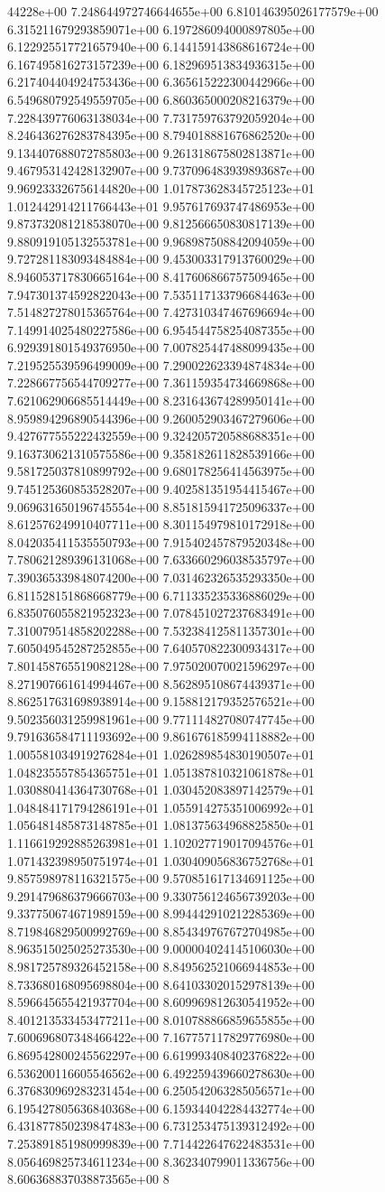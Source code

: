 44228e+00	7.248644972746644655e+00	6.810146395026177579e+00	6.315211679293859071e+00	6.197286094000897805e+00	6.122925517721657940e+00	6.144159143868616724e+00	6.167495816273157239e+00	6.182969513834936315e+00	6.217404404924753436e+00	6.365615222300442966e+00	6.549680792549559705e+00	6.860365000208216379e+00	7.228439776063138034e+00	7.731759763792059204e+00	8.246436276283784395e+00	8.794018881676862520e+00	9.134407688072785803e+00	9.261318675802813871e+00	9.467953142428132907e+00	9.737096483939893687e+00	9.969233326756144820e+00	1.017873628345725123e+01	1.012442914211766443e+01	9.957617693747486953e+00	9.873732081218538070e+00	9.812566650830817139e+00	9.880919105132553781e+00	9.968987508842094059e+00	9.727281183093484884e+00	9.453003317913760029e+00	8.946053717830665164e+00	8.417606866757509465e+00	7.947301374592822043e+00	7.535117133796684463e+00	7.514827278015365764e+00	7.427310347467696694e+00	7.149914025480227586e+00	6.954544758254087355e+00	6.929391801549376950e+00	7.007825447488099435e+00	7.219525539596499009e+00	7.290022623394874834e+00	7.228667756544709277e+00	7.361159354734669868e+00	7.621062906685514449e+00	8.231643674289950141e+00	8.959894296890544396e+00	9.260052903467279606e+00	9.427677555222432559e+00	9.324205720588688351e+00	9.163730621310575586e+00	9.358182611828539166e+00	9.581725037810899792e+00	9.680178256414563975e+00	9.745125360853528207e+00	9.402581351954415467e+00	9.069631650196745554e+00	8.851815941725096337e+00	8.612576249910407711e+00	8.301154979810172918e+00	8.042035411535550793e+00	7.915402457879520348e+00	7.780621289396131068e+00	7.633660296038535797e+00	7.390365339848074200e+00	7.031462326535293350e+00	6.811528151868668779e+00	6.711335235336886029e+00	6.835076055821952323e+00	7.078451027237683491e+00	7.310079514858202288e+00	7.532384125811357301e+00	7.605049545287252855e+00	7.640570822300934317e+00	7.801458765519082128e+00	7.975020070021596297e+00	8.271907661614994467e+00	8.562895108674439371e+00	8.862517631698938914e+00	9.158812179352576521e+00	9.502356031259981961e+00	9.771114827080747745e+00	9.791636584711193692e+00	9.861676185994118882e+00	1.005581034919276284e+01	1.026289854830190507e+01	1.048235557854365751e+01	1.051387810321061878e+01	1.030880414364730768e+01	1.030452083897142579e+01	1.048484171794286191e+01	1.055914275351006992e+01	1.056481485873148785e+01	1.081375634968825850e+01	1.116619292885263981e+01	1.102027719017094576e+01	1.071432398950751974e+01	1.030409056836752768e+01	9.857598978116321575e+00	9.570851617134691125e+00	9.291479686379666703e+00	9.330756124656739203e+00	9.337750674671989159e+00	8.994442910212285369e+00	8.719846829500992769e+00	8.854349767672704985e+00	8.963515025025273530e+00	9.000004024145106030e+00	8.981725789326452158e+00	8.849562521066944853e+00	8.733680168095698804e+00	8.641033020152978139e+00	8.596645655421937704e+00	8.609969812630541952e+00	8.401213533453477211e+00	8.010788866859655855e+00	7.600696807348466422e+00	7.167757117829776980e+00	6.869542800245562297e+00	6.619993408402376822e+00	6.536200116605546562e+00	6.492259439660278630e+00	6.376830969283231454e+00	6.250542063285056571e+00	6.195427805636840368e+00	6.159344042284432774e+00	6.431877850239847483e+00	6.731253475139312492e+00	7.253891851980999839e+00	7.714422647622483531e+00	8.056469825734611234e+00	8.362340799011336756e+00	8.606368837038873565e+00	8